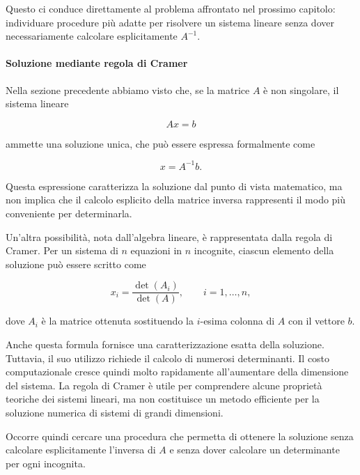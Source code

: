 Questo ci conduce direttamente al problema affrontato nel prossimo
capitolo: individuare procedure più adatte per risolvere un sistema
lineare senza dover necessariamente calcolare esplicitamente
$A^{-1}$.

\paragraph{Soluzione mediante regola di Cramer}
\label{sec:eliminazione-gaussiana}

Nella sezione precedente abbiamo visto che, se la matrice $A$ è
non singolare, il sistema lineare

\begin{equation*}
    Ax=b
\end{equation*}

ammette una soluzione unica, che può essere espressa formalmente come

\begin{equation*}
    x=A^{-1}b.
\end{equation*}

Questa espressione caratterizza la soluzione dal punto di vista
matematico, ma non implica che il calcolo esplicito della matrice
inversa rappresenti il modo più conveniente per determinarla.

Un'altra possibilità, nota dall'algebra lineare, è rappresentata
dalla regola di Cramer. Per un sistema di $n$ equazioni in $n$
incognite, ciascun elemento della soluzione può essere scritto come

\begin{equation*}
    x_i =
    \frac{\det(A_i)}{\det(A)},
    \qquad i=1,\ldots,n,
    \label{eq:cramer}
\end{equation*}

dove $A_i$ è la matrice ottenuta sostituendo la $i$-esima colonna
di $A$ con il vettore $b$.

Anche questa formula fornisce una caratterizzazione esatta della
soluzione. Tuttavia, il suo utilizzo richiede il calcolo di numerosi
determinanti. Il costo computazionale cresce quindi molto rapidamente
all'aumentare della dimensione del sistema. La regola di Cramer è
utile per comprendere alcune proprietà teoriche dei sistemi lineari,
ma non costituisce un metodo efficiente per la soluzione numerica di
sistemi di grandi dimensioni.

Occorre quindi cercare una procedura che permetta di ottenere la
soluzione senza calcolare esplicitamente l'inversa di $A$ e senza
dover calcolare un determinante per ogni incognita.

